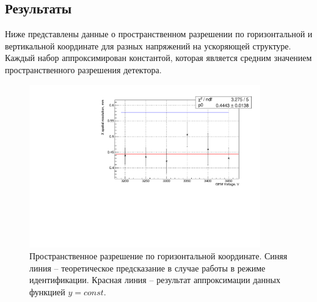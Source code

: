 \subsection{Результаты}
Ниже представлены данные о пространственном разрешении по горизонтальной и вертикальной координате для разных напряжений на ускоряющей структуре. Каждый набор аппроксимирован константой, которая является средним значением пространственного разрешения детектора. 
\begin{figure}[h]
	\centering
	\includegraphics[width= 10cm]{img/x_sp_res.pdf}
	\caption{Пространственное разрешение по горизонтальной координате. Синяя линия -- теоретическое предсказание в случае работы в режиме идентификации. Красная линия -- результат аппроксимации данных функцией $y = const$.}
	\label{fig:x_sp_res}
\end{figure}

